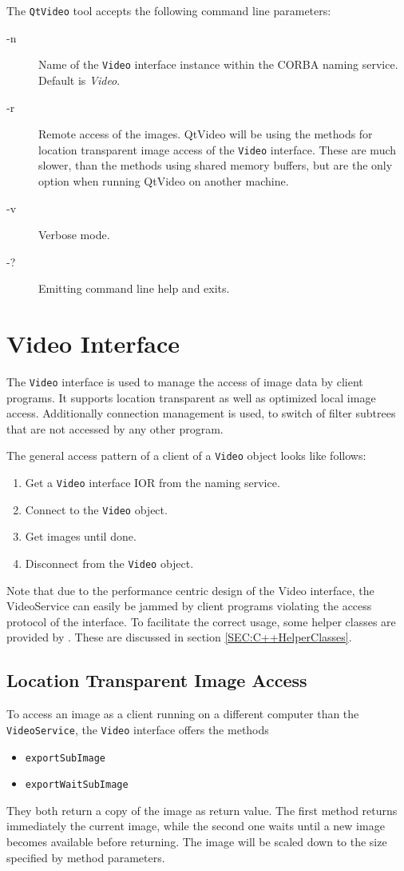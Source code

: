 The {\tt QtVideo} tool accepts the following command line parameters:
\begin{description}
\item[-n] Name of the {\tt Video} interface instance within the CORBA
  naming service. Default is {\em Video}.
\item[-r] Remote access of the images. QtVideo will be using the
  methods for location transparent image access of the {\tt Video}
  interface. These are much slower, than the methods using shared
  memory buffers, but are the only option when running QtVideo on
  another machine.
\item[-v] Verbose mode.
\item[-?] Emitting command line help and exits.
\end{description}

\section{Video Interface}

The {\tt Video} interface is used to manage the access of image data
by client programs. It supports location transparent as well as
optimized local image access. Additionally connection management is
used, to switch of filter subtrees that are not accessed by any other
program.

The general access pattern of a client of a {\tt Video} object looks
like follows:
\begin{enumerate}
\item Get a {\tt Video} interface IOR from the naming service.
\item Connect to the {\tt Video} object.
\item Get images until done.
\item Disconnect from the {\tt Video} object.
\end{enumerate}

Note that due to the performance centric design of the Video
interface, the VideoService can easily be jammed by client programs
violating the access protocol of the interface. To facilitate the
correct usage, some helper classes are provided by \miro. These are
discussed in section \ref{SEC:C++HelperClasses}.

\subsection{Location Transparent Image Access}

To access an image as a client running on a different computer than
the {\tt VideoService}, the {\tt Video} interface offers the methods
\begin{itemize}
\item {\tt exportSubImage}
\item {\tt exportWaitSubImage}
\end{itemize}
They both return a copy of the image as return value. The first method
returns immediately the current image, while the second one waits until
a new image becomes available before returning. The image will be
scaled down to the size specified by method parameters.

